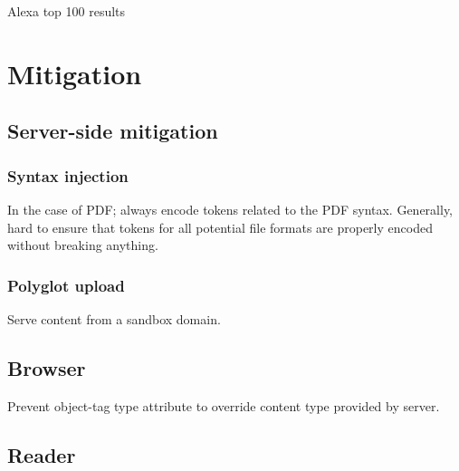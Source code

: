 \documentclass[10pt, conference, compsocconf]{IEEEtran}
\begin{document}
Alexa top 100 results











\section{Mitigation}


\subsection{Server-side mitigation}


\subsubsection{Syntax injection}

In the case of PDF; always encode tokens related to the PDF 
syntax. Generally, hard to ensure that tokens for all potential 
file formats are properly encoded without breaking anything.


\subsubsection{Polyglot upload}

Serve content from a sandbox domain.


\subsection{Browser}

Prevent object-tag type attribute to override content type 
provided by server. 


\subsection{Reader}
\end{document}
